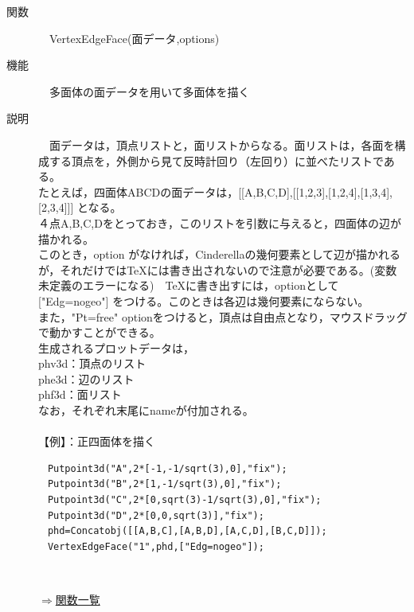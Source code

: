 \documentclass[papersize,a4paper,12pt,uplatex]{jsarticle}
\begin{document}
\begin{description}
\hypertarget{vertexedgeface}{}
\item[関数]　VertexEdgeFace(面データ,options)
\item[機能]　多面体の面データを用いて多面体を描く
\item[説明]　面データは，頂点リストと，面リストからなる。面リストは，各面を構成する頂点を，外側から見て反時計回り（左回り）に並べたリストである。\\
たとえば，四面体ABCDの面データは，[[A,B,C,D],[[1,2,3],[1,2,4],[1,3,4],[2,3,4]]] となる。\\
４点A,B,C,Dをとっておき，このリストを引数に与えると，四面体の辺が描かれる。\\
このとき，option がなければ，Cinderellaの幾何要素として辺が描かれるが，それだけではTeXには書き出されないので注意が必要である。(変数未定義のエラーになる)　TeXに書き出すには，optionとして ["Edg=nogeo"] をつける。このときは各辺は幾何要素にならない。\\
また，"Pt=free" optionをつけると，頂点は自由点となり，マウスドラッグで動かすことができる。\\
生成されるプロットデータは，\\
phv3d：頂点のリスト\\
phe3d：辺のリスト\\
phf3d：面リスト\\
なお，それぞれ末尾にnameが付加される。\\
　\\
【例】：正四面体を描く
\begin{verbatim}
　Putpoint3d("A",2*[-1,-1/sqrt(3),0],"fix");
　Putpoint3d("B",2*[1,-1/sqrt(3),0],"fix");
　Putpoint3d("C",2*[0,sqrt(3)-1/sqrt(3),0],"fix");
　Putpoint3d("D",2*[0,0,sqrt(3)],"fix");
　phd=Concatobj([[A,B,C],[A,B,D],[A,C,D],[B,C,D]]);
　VertexEdgeFace("1",phd,["Edg=nogeo"]);
\end{verbatim}
　　　　

\begin{flushright} \hyperlink{functionlist3d}{$\Rightarrow$関数一覧}\end{flushright}


\end{description}
\end{document}
